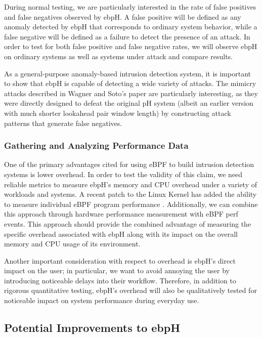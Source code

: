 \documentclass[
  12pt]{findlay}
\begin{document}
During normal testing, we are particularly interested in the rate of
false positives and false negatives observed by ebpH. A false positive
will be defined as any anomaly detected by ebpH that corresponds to
ordinary system behavior, while a false negative will be defined as a
failure to detect the presence of an attack. In order to test for both
false positive and false negative rates, we will observe ebpH on
ordinary systems as well as systems under attack and compare results.

As a general-purpose anomaly-based intrusion detection system, it is
important to show that ebpH is capable of detecting a wide variety of
attacks. The mimicry attacks described in Wagner and Soto's paper
\autocite{wagner02} are particularly interesting, as they were directly
designed to defeat the original pH system (albeit an earlier version
with much shorter lookahead pair window length) by constructing attack
patterns that generate false negatives.

\hypertarget{gathering-and-analyzing-performance-data}{%
\subsubsection{Gathering and Analyzing Performance
Data}\label{gathering-and-analyzing-performance-data}}

One of the primary advantages cited for using eBPF to build intrusion
detection systems is lower overhead. In order to test the validity of
this claim, we need reliable metrics to measure ebpH's memory and CPU
overhead under a variety of workloads and systems. A recent patch to the
Linux Kernel has added the ability to measure individual eBPF program
performance \autocite{starovoitov19a}. Additionally, we can combine this
approach through hardware performance measurement with eBPF perf events.
This approach should provide the combined advantage of measuring the
specific overhead associated with ebpH along with its impact on the
overall memory and CPU usage of its environment.

Another important consideration with respect to overhead is ebpH's
direct impact on the user; in particular, we want to avoid annoying the
user by introducing noticeable delays into their workflow. Therefore, in
addition to rigorous quantitative testing, ebpH's overhead will also be
qualitatively tested for noticeable impact on system performance during
everyday use.

\hypertarget{potential-improvements-to-ebph}{%
\subsection{Potential Improvements to
ebpH}\label{potential-improvements-to-ebph}}
\end{document}
